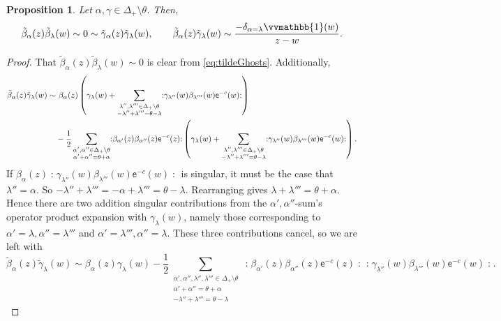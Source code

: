 \documentclass[10pt,a4paper]{amsart}
\numberwithin{equation}{section}
\newcommand{\ee}{\mathsf{e}}   %
\newcommand{\wun}{\vvmathbb{1}}  %
\newcommand{\no}[1]{\mathopen{:} #1 \mathclose{:}} %
\newcommand{\proots}{\Delta_+}                                       %
\newcommand{\hroot}{\theta}                                          %
\theoremstyle{plain}
\newtheorem{proposition}[theorem]{Proposition}
\begin{document}
\begin{proposition} \label{prop:tildeGhostOPEs}
    Let $\alpha, \gamma \in  \proots \setminus \hroot$. Then,
    \begin{equation}
        \tilde{\beta}_\alpha(z) \tilde{\beta}_\lambda(w) \sim 0 \sim \tilde{\gamma}_\alpha(z) \tilde{\gamma}_\lambda(w), \qquad 
        \tilde{\beta}_\alpha(z) \tilde{\gamma}_\lambda(w) \sim \frac{-\delta_{\alpha=\lambda} \wun(w)}{z-w}.
    \end{equation}
\end{proposition}
\begin{proof}
    That $ \tilde{\beta}_\alpha(z) \tilde{\beta}_\lambda(w) \sim 0$ is clear from \eqref{eq:tildeGhosts}. Additionally, 
    \begin{align}
        \tilde{\beta}_\alpha(z) \tilde{\gamma}_\lambda(w) \sim& \ \beta_\alpha(z) \left(\gamma_\lambda(w) 
       + \sum_{\substack{\lambda'',\lambda''' \in \proots \setminus \hroot \\ -\lambda''+\lambda'''=\hroot-\lambda}}\no{\gamma_{\lambda''}(w)\beta_{\lambda'''}(w)\ee^{-c}(w)}\right) \\
        & - \frac{1}{2}\sum_{\substack{\alpha',\alpha'' \in \proots \setminus \hroot \\ \alpha'+\alpha''=\hroot+\alpha}} \no{\beta_{\alpha'} (z) \beta_{\alpha''}(z)\ee^{-c}(z)} \left(\gamma_\lambda(w) 
        + \sum_{\substack{\lambda'',\lambda''' \in \proots \setminus \hroot \\ -\lambda''+\lambda'''=\hroot-\lambda}}\no{\gamma_{\lambda''}(w)\beta_{\lambda'''}(w)\ee^{-c}(w)}\right). \notag
    \end{align}
    If $\beta_\alpha(z) \no{\gamma_{\lambda''}(w)\beta_{\lambda'''}(w)\ee^{-c}(w)}$ is singular, it must be the case that $\lambda'' = \alpha$. So $-\lambda''+\lambda'''= -\alpha+\lambda'''=\hroot-\lambda$. Rearranging gives $\lambda+\lambda'''=\hroot+\alpha$. Hence there are two addition singular contributions from the $\alpha',\alpha''$-sum's operator product expansion with $\gamma_\lambda(w)$, namely those corresponding to $\alpha'=\lambda, \alpha''=\lambda'''$ and  $\alpha'=\lambda''', \alpha''=\lambda$. These three contributions cancel, so we are left with
    \begin{equation} \label{tildebtildegInt}
        \tilde{\beta}_\alpha(z) \tilde{\gamma}_\lambda(w) \sim \beta_\alpha(z) \gamma_\lambda(w)  - \frac{1}{2}\sum_{\substack{\alpha',\alpha'', \lambda'',\lambda'''  \in \proots \setminus \hroot \\ \alpha'+\alpha''=\hroot+\alpha \\ -\lambda''+\lambda'''=\hroot-\lambda}} \no{\beta_{\alpha'} (z) \beta_{\alpha''}(z)\ee^{-c}(z)} \no{\gamma_{\lambda''}(w)\beta_{\lambda'''}(w)\ee^{-c}(w)}.
    \end{equation}
    

\end{proof}
\end{document}
